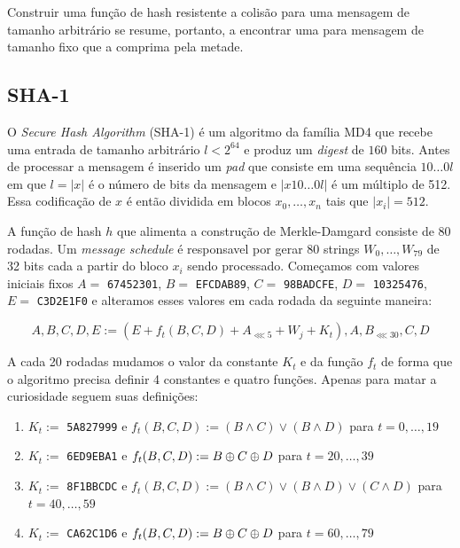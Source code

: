 Construir uma função de hash resistente a colisão para uma mensagem de tamanho arbitrário se resume, portanto, a encontrar uma para mensagem de tamanho fixo que a comprima pela metade.

\subsection{SHA-1}
\label{sec:sha-1}

O {\em Secure Hash Algorithm} (SHA-1) é um algoritmo da família MD4 que recebe uma entrada de tamanho arbitrário $l < 2^{64}$ e produz um {\em digest} de $160$ bits.
Antes de processar a mensagem é inserido um {\em pad} que consiste em uma sequência $10 \dots 0l$ em que $l = |x|$ é o número de bits da mensagem e $|x10 \dots 0l|$ é um múltiplo de 512.
Essa codificação de $x$ é então dividida em blocos $x_0, \dots, x_n$ tais que $|x_i| = 512$.

A função de hash $h$ que alimenta a construção de Merkle-Damgard consiste de 80 rodadas.
Um {\em message schedule} é responsavel por gerar 80 strings $W_0, \dots, W_{79}$ de 32 bits cada a partir do bloco $x_i$ sendo processado. 
Começamos com valores iniciais fixos $A =$ {\tt 67452301}, $B =$ {\tt EFCDAB89}, $C =$ {\tt 98BADCFE}, $D =$ {\tt 10325476}, $E =$ {\tt C3D2E1F0} e alteramos esses valores em cada rodada da seguinte maneira:

\begin{displaymath}
  A, B, C, D, E := (E + f_t(B,C,D) + A_{\lll 5} + W_j + K_t), A, B_{\lll 30}, C, D
\end{displaymath}

A cada 20 rodadas mudamos o valor da constante $K_t$ e da função $f_t$ de forma que o algoritmo precisa definir 4 constantes e quatro funções.
Apenas para matar a curiosidade seguem suas definições:
\begin{enumerate}
\item $K_t :=$ {\tt 5A827999} e $f_t(B,C,D) := (B \land C) \lor (B \land D)$ para $t = 0, \dots, 19$
\item $K_t :=$ {\tt 6ED9EBA1} e $f_t(B,C,D) := B \oplus C \oplus D$ para $t = 20, \dots, 39$ 
\item $K_t :=$ {\tt 8F1BBCDC} e $f_t(B,C,D) := (B \land C) \lor (B \land D) \lor (C \land D)$ para $t = 40, \dots, 59$
\item $K_t :=$ {\tt CA62C1D6} e $f_t(B,C,D) := B \oplus C \oplus D$ para $t = 60, \dots, 79$ 
\end{enumerate}

